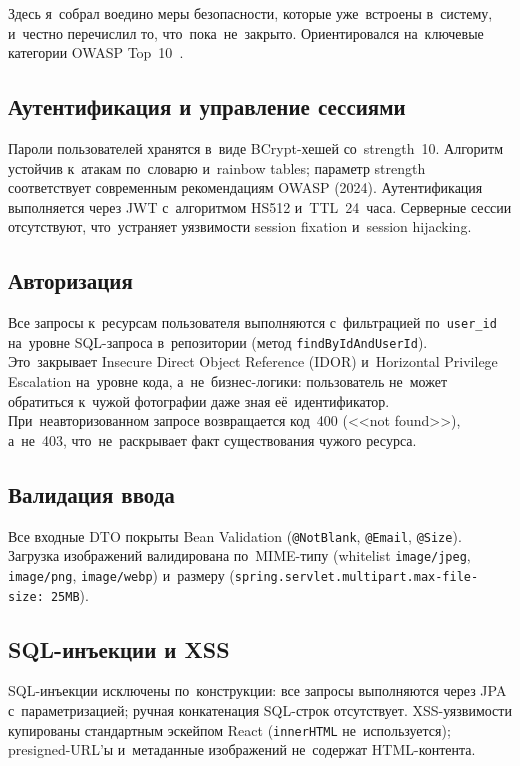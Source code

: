 \documentclass[a4paper,12pt]{diplom}
\begin{document}
Здесь я~собрал воедино меры безопасности, которые уже~встроены в~систему, и~честно перечислил то, что~пока~не~закрыто. Ориентировался на~ключевые категории OWASP Top~10~\cite{OWASPTop10}.

\subsection{Аутентификация и управление сессиями}

Пароли пользователей хранятся в~виде BCrypt-хешей со~strength~10. Алгоритм устойчив к~атакам по~словарю и~rainbow tables; параметр strength соответствует современным рекомендациям OWASP (2024). Аутентификация выполняется через JWT с~алгоритмом HS512 и~TTL~24~часа. Серверные сессии отсутствуют, что~устраняет уязвимости session fixation и~session hijacking.

\subsection{Авторизация}

Все запросы к~ресурсам пользователя выполняются с~фильтрацией по~\verb|user_id| на~уровне SQL-запроса в~репозитории (метод \verb|findByIdAndUserId|). Это~закрывает Insecure Direct Object Reference (IDOR) и~Horizontal Privilege Escalation на~уровне кода, а~не~бизнес-логики: пользователь не~может обратиться к~чужой фотографии даже зная её~идентификатор. При~неавторизованном запросе возвращается код~400 (<<not found>>), а~не~403, что~не~раскрывает факт существования чужого ресурса.

\subsection{Валидация ввода}

Все входные DTO покрыты Bean Validation (\verb|@NotBlank|, \verb|@Email|, \verb|@Size|). Загрузка изображений валидирована по~MIME-типу (whitelist \verb|image/jpeg|, \verb|image/png|, \verb|image/webp|) и~размеру (\verb|spring.servlet.multipart.max-file-size: 25MB|).

\subsection{SQL-инъекции и XSS}

SQL-инъекции исключены по~конструкции: все запросы выполняются через JPA с~параметризацией; ручная конкатенация SQL-строк отсутствует. XSS-уязвимости купированы стандартным эскейпом React (\verb|innerHTML| не~используется); presigned-URL'ы и~метаданные изображений не~содержат HTML-контента.
\end{document}
